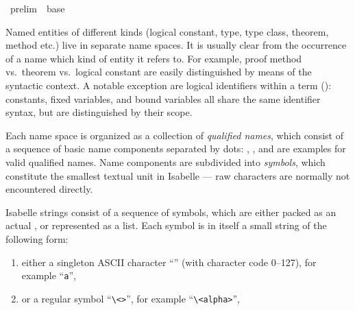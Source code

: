 %
\begin{isabellebody}%
\def\isabellecontext{prelim}%
%
\isadelimtheory
\isanewline
\isanewline
\isanewline
%
\endisadelimtheory
%
\isatagtheory
{}\isamarkupfalse%
\ prelim\ \ base\ %
\endisatagtheory
{\isafoldtheory}%
%
\isadelimtheory
%
\endisadelimtheory
%
\isamarkuptrue%
%
\isamarkuptrue%
%
\begin{isamarkuptext}%
Named entities of different kinds (logical constant, type,
type class, theorem, method etc.) live in separate name spaces.  It is
usually clear from the occurrence of a name which kind of entity it
refers to.  For example, proof method  vs.\ theorem
 vs.\ logical constant  are easily
distinguished by means of the syntactic context.  A notable exception
are logical identifiers within a term (): constants,
fixed variables, and bound variables all share the same identifier
syntax, but are distinguished by their scope.

Each name space is organized as a collection of \emph{qualified
names}, which consist of a sequence of basic name components separated
by dots: , , and 
are examples for valid qualified names.  Name components are
subdivided into \emph{symbols}, which constitute the smallest textual
unit in Isabelle --- raw characters are normally not encountered
directly.%
\end{isamarkuptext}%
\isamarkuptrue%
%
\isamarkuptrue%
%
\begin{isamarkuptext}%
Isabelle strings consist of a sequence of
symbols, which are either packed as an
actual , or represented as a list.  Each symbol is in
itself a small string of the following form:

\begin{enumerate}

\item either a singleton ASCII character ``'' (with
character code 0--127), for example ``\verb,a,'',

\item or a regular symbol ``\verb,\,\verb,<,\verb,>,'',
for example ``\verb,\,\verb,<alpha>,'',


\end{enumerate}
\end{isamarkuptext}
\end{isabellebody}
